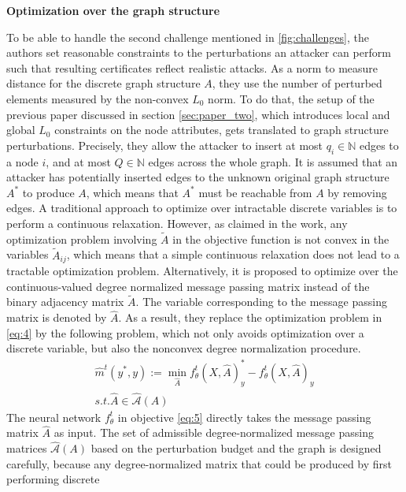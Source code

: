 \documentclass[a4paper,preprint]{sig-alternate}
\begin{document}
\textbf{Optimization over the graph structure}\newline

To be able to handle the second challenge mentioned in \ref{fig:challenges}, the authors set reasonable constraints to 
the perturbations an attacker can perform such that resulting certificates reflect realistic attacks.
As a norm to measure distance for the discrete graph structure $A$, they use the number of perturbed elements
measured by the non-convex $L_0$ norm. To do that, the setup of the previous paper discussed in section \ref{sec:paper_two},
which introduces local and global $L_0$ constraints on the node attributes, gets translated to graph structure perturbations.
Precisely, they allow the attacker to insert at most $q_i \in \mathbb{N}$ edges to a node $i$, and at most $Q \in \mathbb{N}$ edges
across the whole graph. It is assumed that an attacker has potentially inserted edges to the unknown original graph 
structure $A^{\ast}$ to produce $A$, which means that $A^{\ast}$ must be reachable from $A$ by removing edges.\newline
A traditional approach to optimize over intractable discrete variables is to perform a continuous relaxation.
However, as claimed in the work, any optimization problem involving $\tilde{A}$ in the objective function is not convex 
in the variables $\tilde{A}_{ij}$, which means that a simple continuous relaxation does not lead to a tractable optimization problem.
Alternatively, it is proposed to optimize over the continuous-valued degree normalized message passing matrix instead of the binary 
adjacency matrix $\tilde{A}$. The variable corresponding to the message passing matrix is denoted by $\hat{A}$.
As a result, they replace the optimization problem in \ref{eq:4} by the following problem, which not only avoids optimization over
a discrete variable, but also the nonconvex degree normalization procedure.
\begin{gather}
\label{eq:5}
    \hat{m}^t (y^{\ast}, y) := \min_{\hat{A}} f_{\theta}^t (X, \hat{A})_y^{\ast}
    - f_{\theta}^t (X, \hat{A})_y \\
    s.t. \hat{A} \in \mathcal{\hat{A}}(A) \nonumber
\end{gather}
The neural network $f_{\theta}^t$ in objective \ref{eq:5} directly takes the message passing matrix $\hat{A}$ as input.
The set of admissible degree-normalized message passing matrices $\mathcal{\hat{A}}(A)$ based
on the perturbation budget and the graph is designed carefully, because any degree-normalized matrix that could be produced by first performing discrete
\end{document}
